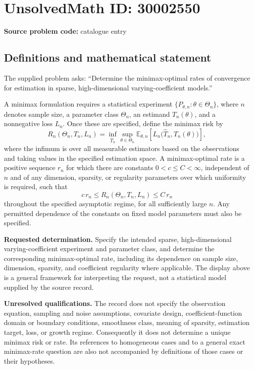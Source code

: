 \documentclass[11pt]{article}
\begin{document}
\section*{UnsolvedMath ID: 30002550}
\textbf{Source problem code:} catalogue entry
\subsection{Definitions and mathematical statement}
The supplied problem asks: ``Determine the minimax-optimal rates of convergence for estimation in sparse, high-dimensional varying-coefficient models.''

A minimax formulation requires a statistical experiment \(\{P_{\theta,n}:\theta\in\Theta_n\}\), where \(n\) denotes sample size, a parameter class \(\Theta_n\), an estimand \(T_n(\theta)\), and a nonnegative loss \(L_n\). Once these are specified, define the minimax risk by
\[
R_n(\Theta_n,T_n,L_n)
=\inf_{\widehat T_n}\sup_{\theta\in\Theta_n}
\mathbb E_{\theta,n}\!\left[L_n\bigl(\widehat T_n,T_n(\theta)\bigr)\right],
\]
where the infimum is over all measurable estimators based on the observations and taking values in the specified estimation space. A minimax-optimal rate is a positive sequence \(r_n\) for which there are constants \(0<c\leq C<\infty\), independent of \(n\) and of any dimension, sparsity, or regularity parameters over which uniformity is required, such that
\[
c\,r_n\leq R_n(\Theta_n,T_n,L_n)\leq C\,r_n
\]
throughout the specified asymptotic regime, for all sufficiently large \(n\). Any permitted dependence of the constants on fixed model parameters must also be specified.

\textbf{Requested determination.} Specify the intended sparse, high-dimensional varying-coefficient experiment and parameter class, and determine the corresponding minimax-optimal rate, including its dependence on sample size, dimension, sparsity, and coefficient regularity where applicable. The display above is a general framework for interpreting the request, not a statistical model supplied by the source record.

\textbf{Unresolved qualifications.} The record does not specify the observation equation, sampling and noise assumptions, covariate design, coefficient-function domain or boundary conditions, smoothness class, meaning of sparsity, estimation target, loss, or growth regime. Consequently it does not determine a unique minimax risk or rate. Its references to homogeneous cases and to a general exact minimax-rate question are also not accompanied by definitions of those cases or their hypotheses.
\end{document}
